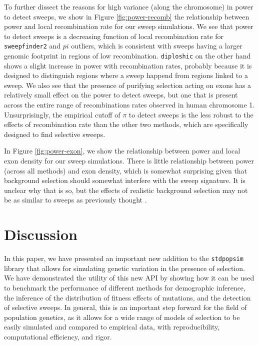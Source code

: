 \documentclass[hidelinks]{article}
\newcommand{\stdpopsim}{\texttt{stdpopsim}\xspace}
\newcommand{\sweepfinder}{\texttt{sweepfinder2}\xspace}
\newcommand{\diploshic}{\texttt{diploshic}\xspace}
\begin{document}
    To further dissect the reasons for high variance (along the chromosome) in power to detect sweeps,
    we show in Figure \ref{fig:power-recomb} the relationship between power and local recombination rate for our sweep simulations.
    We see that power to detect sweeps is
    a decreasing function of local recombination rate for \sweepfinder and $pi$ outliers,
    which is consistent with sweeps having a larger genomic footprint in regions of low
    recombination.
    \diploshic on the other hand shows a slight increase in power with recombination rates,
    probably because it is designed to distinguish regions where a sweep happend from regions linked to a sweep.
    We also see that the presence of purifying selection acting on exons has a relatively small effect on the power to detect sweeps,    
    but one that is present across the entire range of recombinations rates observed in human chromosome 1. 
    Unsurprisingly, the empirical cutoff of $\pi$ to detect sweeps is the less robust to the effects of recombination rate than the other two methods,
    which are specifically designed to find selective sweeps. 

    In Figure \ref{fig:power-exon}, we show the relationship between power and local exon density for our sweep simulations.
    There is little relationship between power (across all methods) and exon density,
    which is somewhat surprising given that background selection should somewhat interfere with the sweep signature.
    It is unclear why that is so, but the effects of realistic background selection may not be as similar to sweeps as previously thought \citep{schrider2020background}.

\section*{Discussion}
    \label{Discussion}
    In this paper, we have presented an important new addition to the \stdpopsim{} library
    that allows for simulating genetic variation in the presence of selection.
    We have demonstrated the utility of this new API by showing how it can be used to benchmark
    the performance of different methods for demographic inference, the inference of the distribution
    of fitness effects of mutations, and the detection of selective sweeps.
    In general, this is an important step forward for the field of population genetics,
    as it allows for a wide range of models of selection to be easily simulated and compared to
    empirical data, with reproducibility, computational efficiency, and rigor.
\end{document}
